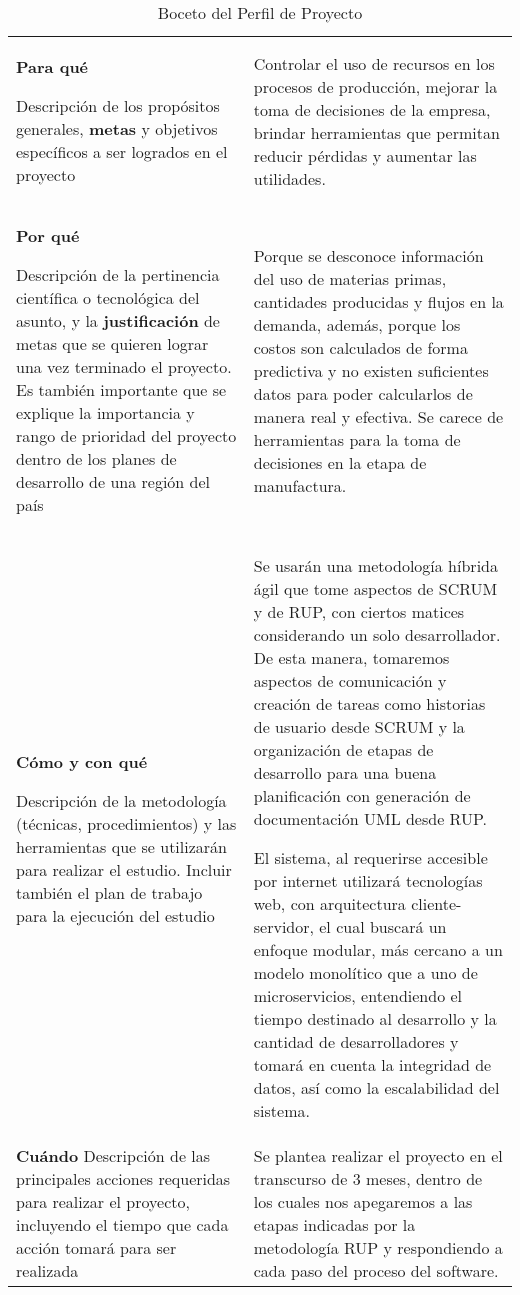 \begin{table}[htbp]
\begin{tabular}{p{}p{}}
        \textbf{Para qué}

        {\tiny Descripción de los propósitos generales, \textbf{metas} y objetivos específicos a ser logrados en el proyecto} &

        Controlar el uso de recursos en los procesos de producción, mejorar la toma de decisiones de la empresa, brindar herramientas que permitan reducir pérdidas y aumentar las utilidades. \\

        \textbf{Por qué}

        {\tiny Descripción de la pertinencia científica o tecnológica del asunto, y la \textbf{justificación} de metas que se quieren lograr una vez terminado el proyecto. Es también importante que se explique la importancia y rango de prioridad del proyecto dentro de los planes de desarrollo de una región del país} &

        Porque se desconoce información del uso de materias primas, cantidades producidas y flujos en la demanda, además, porque los costos son calculados de forma predictiva y no existen suficientes datos para poder calcularlos de manera real y efectiva. Se carece de herramientas para la toma de decisiones en la etapa de manufactura. \\

        \textbf{Cómo y con qué}

        {\tiny Descripción de la metodología (técnicas, procedimientos) y las herramientas que se utilizarán para realizar el estudio. Incluir también el plan de trabajo para la ejecución del estudio} &

        Se usarán una metodología híbrida ágil que tome aspectos de SCRUM y de RUP, con ciertos matices considerando un solo desarrollador. De esta manera, tomaremos aspectos de comunicación y creación de tareas como historias de usuario desde SCRUM y la organización de etapas de desarrollo para una buena planificación con generación de documentación UML desde RUP.

        El sistema, al requerirse accesible por internet utilizará tecnologías web, con arquitectura cliente-servidor, el cual buscará un enfoque modular, más cercano a un modelo monolítico que a uno de microservicios, entendiendo el tiempo destinado al desarrollo y la cantidad de desarrolladores y tomará en cuenta la integridad de datos, así como la escalabilidad del sistema. \\

        \textbf{Cuándo}
        {\tiny Descripción de las principales acciones requeridas para realizar el proyecto, incluyendo el tiempo que cada acción tomará para ser realizada} &

        Se plantea realizar el proyecto en el transcurso de 3 meses, dentro de los cuales nos apegaremos a las etapas indicadas por la metodología RUP y respondiendo a cada paso del proceso del software. \\
        \bottomrule
    \end{tabular}
    \caption{Boceto del Perfil de Proyecto}
    \label{table: boceto}
\end{table}
